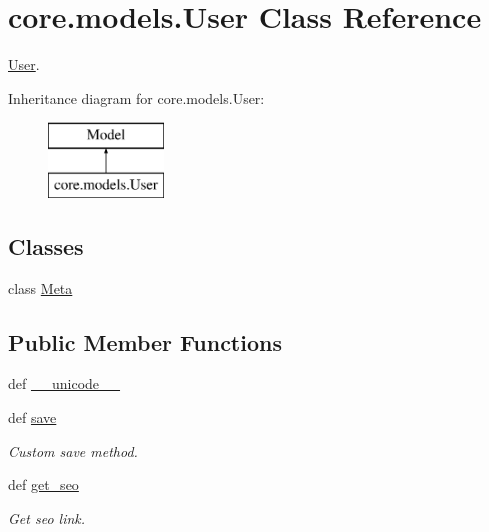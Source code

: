 \hypertarget{classcore_1_1models_1_1User}{\section{core.\-models.\-User Class Reference}
\label{classcore_1_1models_1_1User}
}


\hyperlink{classcore_1_1models_1_1User}{User}.  


Inheritance diagram for core.\-models.\-User\-:\begin{figure}[H]
\begin{center}
\leavevmode
\includegraphics[height=2.000000cm]{classcore_1_1models_1_1User}
\end{center}
\end{figure}
\subsection*{Classes}
\begin{DoxyCompactItemize}
\item 
class \hyperlink{classcore_1_1models_1_1User_1_1Meta}{Meta}
\end{DoxyCompactItemize}
\subsection*{Public Member Functions}
\begin{DoxyCompactItemize}
\item 
def \hyperlink{classcore_1_1models_1_1User_a5c083b460e2d14df907edde626f3df4d}{\-\_\-\-\_\-unicode\-\_\-\-\_\-}
\item 
def \hyperlink{classcore_1_1models_1_1User_aafe570b9f5a7f23c072d5fdb1e17ad13}{save}
\begin{DoxyCompactList}\small\item\em Custom save method. \end{DoxyCompactList}\item 
def \hyperlink{classcore_1_1models_1_1User_a72865af96fbe29266f8a6131643170b0}{get\-\_\-seo}
\begin{DoxyCompactList}\small\item\em Get seo link. \end{DoxyCompactList}\end{DoxyCompactItemize}
